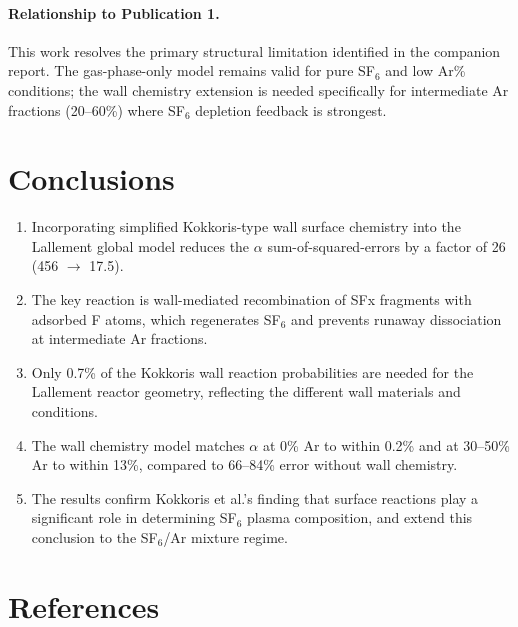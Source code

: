 \documentclass[11pt,a4paper]{article}
\begin{document}
\paragraph{Relationship to Publication 1.}  This work resolves the primary structural limitation identified in the companion report.  The gas-phase-only model remains valid for pure SF$_6$ and low Ar\% conditions; the wall chemistry extension is needed specifically for intermediate Ar fractions (20--60\%) where SF$_6$ depletion feedback is strongest.

\section{Conclusions}

\begin{enumerate}
\item Incorporating simplified Kokkoris-type wall surface chemistry into the Lallement global model reduces the $\alpha$ sum-of-squared-errors by a factor of 26 (456 $\to$ 17.5).

\item The key reaction is wall-mediated recombination of SFx fragments with adsorbed F atoms, which regenerates SF$_6$ and prevents runaway dissociation at intermediate Ar fractions.

\item Only 0.7\% of the Kokkoris wall reaction probabilities are needed for the Lallement reactor geometry, reflecting the different wall materials and conditions.

\item The wall chemistry model matches $\alpha$ at 0\% Ar to within 0.2\% and at 30--50\% Ar to within 13\%, compared to 66--84\% error without wall chemistry.

\item The results confirm Kokkoris et al.'s finding that surface reactions play a significant role in determining SF$_6$ plasma composition, and extend this conclusion to the SF$_6$/Ar mixture regime.
\end{enumerate}

\section*{References}
\end{document}
